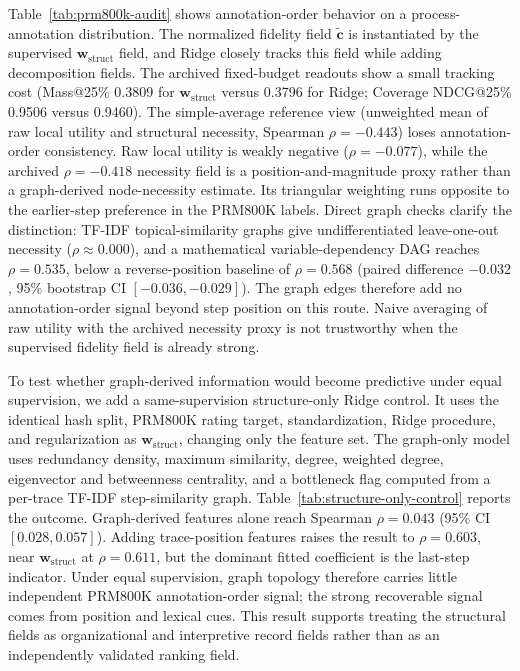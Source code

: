 \documentclass[pdflatex,sn-mathphys-num,iicol]{sn-jnl}
\newcommand{\wstruct}{\ensuremath{\mathbf{w}_{\mathrm{struct}}}}
\begin{document}
Table~\ref{tab:prm800k-audit} shows annotation-order behavior on a process-annotation distribution. The normalized fidelity field $\tilde{\mathbf{c}}$ is instantiated by the supervised \wstruct{} field, and Ridge closely tracks this field while adding decomposition fields. The archived fixed-budget readouts show a small tracking cost (Mass@25\% 0.3809 for \wstruct{} versus 0.3796 for Ridge; Coverage NDCG@25\% 0.9506 versus 0.9460). The simple-average reference view (unweighted mean of raw local utility and structural necessity, Spearman $\rho = -0.443$) loses annotation-order consistency. Raw local utility is weakly negative ($\rho=-0.077$), while the archived $\rho=-0.418$ necessity field is a position-and-magnitude proxy rather than a graph-derived node-necessity estimate. Its triangular weighting runs opposite to the earlier-step preference in the PRM800K labels. Direct graph checks clarify the distinction: TF-IDF topical-similarity graphs give undifferentiated leave-one-out necessity ($\rho\approx0.000$), and a mathematical variable-dependency DAG reaches $\rho=0.535$, below a reverse-position baseline of $\rho=0.568$ (paired difference $-0.032$, 95\% bootstrap CI $[-0.036,-0.029]$). The graph edges therefore add no annotation-order signal beyond step position on this route. Naive averaging of raw utility with the archived necessity proxy is not trustworthy when the supervised fidelity field is already strong.

To test whether graph-derived information would become predictive under equal supervision, we add a same-supervision structure-only Ridge control. It uses the identical hash split, PRM800K rating target, standardization, Ridge procedure, and regularization as \wstruct{}, changing only the feature set. The graph-only model uses redundancy density, maximum similarity, degree, weighted degree, eigenvector and betweenness centrality, and a bottleneck flag computed from a per-trace TF-IDF step-similarity graph. Table~\ref{tab:structure-only-control} reports the outcome. Graph-derived features alone reach Spearman $\rho=0.043$ (95\% CI $[0.028,0.057]$). Adding trace-position features raises the result to $\rho=0.603$, near \wstruct{} at $\rho=0.611$, but the dominant fitted coefficient is the last-step indicator. Under equal supervision, graph topology therefore carries little independent PRM800K annotation-order signal; the strong recoverable signal comes from position and lexical cues. This result supports treating the structural fields as organizational and interpretive record fields rather than as an independently validated ranking field.
\end{document}
